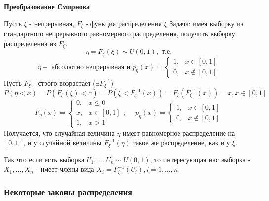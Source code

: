 \noindent \textbf{Преобразование Смирнова}

Пусть $\xi$ - непрерывная, $F_{\xi}$ - функция распределения $\xi$ Задача: имея выборку из стандартного непрерывного равномерного распределения, получить выборку распределения из $F_{\xi}$.
\[ \eta = F_{\xi} (\xi) \sim U(0,1), \text{ т.е.} \]
\[
\eta - \text{ абсолютно непрерывная и } p_{\eta}(x) =
\begin{cases}
	1, & x \in [0, 1] \\
	0, & x \notin [0, 1]
\end{cases}
\]
Пусть $F_{\xi}$ - строго возрастает ($\exists F_{\xi}^{-1}$)
\[ P(\eta < x) = P(F_{\xi} (\xi) < x) = P(\xi < F_{\xi}^{-1} (x)) = F_{\xi} (F_{\xi}^{-1} (x)) = x, x \in [0, 1] \]
\[
F_{\eta} (x) =
\begin{cases}
	0, & x \le 0 \\
	x, & x \in [0, 1] \\
	1, & x > 1
\end{cases};
~~~~~~
p_{\eta} (x) =
\begin{cases}
	1, & x \in [0, 1] \\
	0, & x \notin [0, 1]
\end{cases}
\]
Получается, что случайная величина $\eta$ имеет равномерное распределение на $[0, 1]$, и у случайной величины $F_{\xi}^{-1} (\eta)$ такое же распределение, как и у $\xi$.

Так что если есть выборка $U_1, \dots, U_n \sim U(0, 1)$, то интересующая нас выборка - $X_1, \dots, X_n$ - имеет члены вида $X_i = F_{\xi}^{-1} (U_i), i = 1, \dots, n$.

\subsubsection{Некоторые законы распределения}

